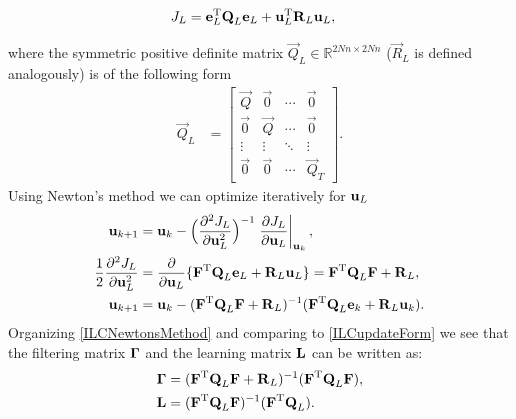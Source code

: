 \begin{equation}
\begin{aligned}
J_L &= \boldsymbol{\mathrm{e}}_L^{\mathrm{T}}\boldsymbol{\mathrm{Q}}_L\boldsymbol{\mathrm{e}}_L + \boldsymbol{\mathrm{u}}_L^{\mathrm{T}}\boldsymbol{\mathrm{R}}_L\boldsymbol{\mathrm{u}}_L,
\end{aligned}
\label{costFunctional}
\end{equation}

\noindent where the symmetric positive definite matrix $\vec{Q}_L \in \mathbb{R}^{2Nn \times 2Nn}$ ($\vec{R}_L$ is defined analogously) is of the following form
%
\begin{equation*}
\begin{aligned}
 \vec{Q}_L &= 
 \begin{bmatrix}
  \vec{Q} & \vec{0} & \cdots & \vec{0} \\
  \vec{0} & \vec{Q} & \cdots & \vec{0} \\
  \vdots  & \vdots  & \ddots & \vdots  \\
  \vec{0} & \vec{0} & \cdots & \vec{Q}_T
 \end{bmatrix}.
\end{aligned}
\end{equation*}
%
\noindent Using Newton's method we can optimize iteratively for $\boldsymbol{\mathrm{u}}_L$
%
\begin{equation}
\begin{aligned}
\boldsymbol{\mathrm{u}}_{k+1} &= \boldsymbol{\mathrm{u}}_k - \Big(\frac{\partial^{2}J_L}{\partial\boldsymbol{\mathrm{u}}^{2}_L}\Big)^{-1}\left.\frac{\partial{J_L}}{\partial{\boldsymbol{\mathrm{u}}_L}}\right|_{\boldsymbol{\mathrm{u}}_k}, \\
\frac{1}{2}\frac{\partial^{2}J_L}{\partial\boldsymbol{\mathrm{u}}^{2}_L} &= \frac{\partial}{\partial\boldsymbol{\mathrm{u}}_L}\{\boldsymbol{\mathrm{F}}^{\mathrm{T}}\boldsymbol{\mathrm{Q}}_L\boldsymbol{\mathrm{e}}_L + \boldsymbol{\mathrm{R}}_L\boldsymbol{\mathrm{u}}_L\} = \boldsymbol{\mathrm{F}}^{\mathrm{T}}\boldsymbol{\mathrm{Q}}_L\boldsymbol{\mathrm{F}} + \boldsymbol{\mathrm{R}}_L, \\
\boldsymbol{\mathrm{u}}_{k+1} &= \boldsymbol{\mathrm{u}}_k - (\boldsymbol{\mathrm{F}}^{\mathrm{T}}\boldsymbol{\mathrm{Q}}_L\boldsymbol{\mathrm{F}} + \boldsymbol{\mathrm{R}}_L)^{-1}(\boldsymbol{\mathrm{F}}^{\mathrm{T}}\boldsymbol{\mathrm{Q}}_L\boldsymbol{\mathrm{e}}_k + \boldsymbol{\mathrm{R}}_L\boldsymbol{\mathrm{u}}_k).
\end{aligned}
\label{ILCNewtonsMethod}
\end{equation}
%
\noindent Organizing \eqref{ILCNewtonsMethod} and comparing to \eqref{ILCupdateForm} we see that the filtering matrix $\boldsymbol{\mathrm{\Gamma}}$ and the learning matrix $\boldsymbol{\mathrm{L}}$ can be written as:
%
\begin{equation}
\begin{aligned}
\boldsymbol{\mathrm{\Gamma}} &= (\boldsymbol{\mathrm{F}}^{\mathrm{T}}\boldsymbol{\mathrm{Q}}_L\boldsymbol{\mathrm{F}} + \boldsymbol{\mathrm{R}}_L)^{-1}(\boldsymbol{\mathrm{F}}^{\mathrm{T}}\boldsymbol{\mathrm{Q}}_L\boldsymbol{\mathrm{F}}),\\
\boldsymbol{\mathrm{L}} &= (\boldsymbol{\mathrm{F}}^{\mathrm{T}}\boldsymbol{\mathrm{Q}}_L\boldsymbol{\mathrm{F}})^{-1}(\boldsymbol{\mathrm{F}}^{\mathrm{T}}\boldsymbol{\mathrm{Q}}_L).
\end{aligned}
\label{qAndlMatrices}
\end{equation}
